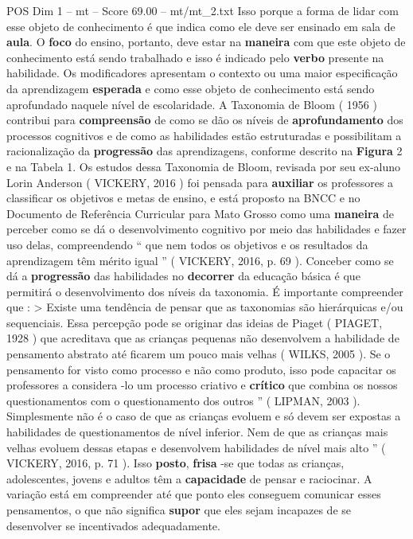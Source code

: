 \begin{textsample}{POS Dim 1 – mt – Score 69.00 – mt/mt\_2.txt}
Isso porque a forma de lidar com esse objeto de conhecimento é que indica como ele deve ser ensinado em sala de \textbf{aula}.
O \textbf{foco} do ensino, portanto, deve estar na \textbf{maneira} com que este objeto de conhecimento está sendo trabalhado e isso é indicado pelo \textbf{verbo} presente na habilidade.
Os modificadores apresentam o contexto ou uma maior especificação da aprendizagem \textbf{esperada} e como esse objeto de conhecimento está sendo aprofundado naquele nível de escolaridade.
A Taxonomia de Bloom ( 1956 ) contribui para \textbf{compreensão} de como se dão os níveis de \textbf{aprofundamento} dos processos cognitivos e de como as habilidades estão estruturadas e possibilitam a racionalização da \textbf{progressão} das aprendizagens, conforme descrito na \textbf{Figura} 2 e na Tabela 1.
Os estudos dessa Taxonomia de Bloom, revisada por seu ex-aluno Lorin Anderson ( VICKERY, 2016 ) foi pensada para \textbf{auxiliar} os professores a classificar os objetivos e metas de ensino, e está proposto na BNCC e no Documento de Referência Curricular para Mato Grosso como uma \textbf{maneira} de perceber como se dá o desenvolvimento cognitivo por meio das habilidades e fazer uso delas, compreendendo “ que nem todos os objetivos e os resultados da aprendizagem têm mérito igual ” ( VICKERY, 2016, p. 69 ).
Conceber como se dá a \textbf{progressão} das habilidades no \textbf{decorrer} da educação básica é que permitirá o desenvolvimento dos níveis da taxonomia.
É importante compreender que : > Existe uma tendência de pensar que as taxonomias são hierárquicas e/ou sequenciais.
Essa percepção pode se originar das ideias de Piaget ( PIAGET, 1928 ) que acreditava que as crianças pequenas não desenvolvem a habilidade de pensamento abstrato até ficarem um pouco mais velhas ( WILKS, 2005 ).
Se o pensamento for visto como processo e não como produto, isso pode capacitar os professores a considera -lo um processo criativo e \textbf{crítico} que combina os nossos questionamentos com o questionamento dos outros ” ( LIPMAN, 2003 ).
Simplesmente não é o caso de que as crianças evoluem e só devem ser expostas a habilidades de questionamentos de nível inferior.
Nem de que as crianças mais velhas evoluem dessas etapas e desenvolvem habilidades de nível mais alto ” ( VICKERY, 2016, p. 71 ).
Isso \textbf{posto}, \textbf{frisa} -se que todas as crianças, adolescentes, jovens e adultos têm a \textbf{capacidade} de pensar e raciocinar.
A variação está em compreender até que ponto eles conseguem comunicar esses pensamentos, o que não significa \textbf{supor} que eles sejam incapazes de se desenvolver se incentivados adequadamente.

\end{textsample}
